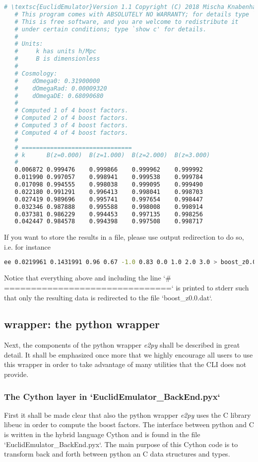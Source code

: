 \documentclass[american,11pt]{article}
\begin{document}
\begin{lstlisting}[language=bash]
   # \textsc{EuclidEmulator}Version 1.1 Copyright (C) 2018 Mischa Knabenhans & Joachim Stadel
   # This program comes with ABSOLUTELY NO WARRANTY; for details type `show w'.
   # This is free software, and you are welcome to redistribute it
   # under certain conditions; type `show c' for details.
   #
   # Units:
   # 	 k has units h/Mpc
   # 	 B is dimensionless
   #
   # Cosmology:
   #	dOmega0: 0.31900000
   #	dOmegaRad: 0.00009320
   #	dOmegaDE: 0.68090680
   #
   # Computed 1 of 4 boost factors.
   # Computed 2 of 4 boost factors.
   # Computed 3 of 4 boost factors.
   # Computed 4 of 4 boost factors.
   #
   # ===============================
   # k		B(z=0.000)	B(z=1.000)	B(z=2.000)	B(z=3.000)
   #
   0.006872	0.999476	0.999866	0.999962	0.999992
   0.011990	0.997057	0.998941	0.999538	0.999784
   0.017098	0.994555	0.998038	0.999095	0.999490
   0.022180	0.991291	0.996413	0.998041	0.998703
   0.027419	0.989696	0.995741	0.997654	0.998447
   0.032346	0.987888	0.995588	0.998008	0.998914
   0.037381	0.986229	0.994453	0.997135	0.998256
   0.042447	0.984578	0.994398	0.997508	0.998717
\end{lstlisting}
 If you want to store the results in a file, please use output redirection to do so, i.e. for instance
\begin{lstlisting}[language=bash]
   ee 0.0219961 0.1431991 0.96 0.67 -1.0 0.83 0.0 1.0 2.0 3.0 > boost_z0.0.dat
\end{lstlisting}
Notice that everything above and including the line `\# ===============================` is printed to stderr such that only the resulting data is redirected to the file `boost\_z0.0.dat`.

\subsection{wrapper: the python wrapper}
Next, the components of the python wrapper \textit{e2py} shall be described in great detail. It shall be emphasized once more that we highly encourage all users to use this wrapper in order to take advantage of many utilities that the CLI does not provide.

\subsubsection{The Cython layer in `EuclidEmulator\_BackEnd.pyx`}
First it shall be made clear that also the python wrapper \textit{e2py} uses the C library libeuc in order to compute the boost factors. The interface between python and C is written in the hybrid language Cython and is found in the file `EuclidEmulator\_BackEnd.pyx`. The main purpose of this Cython code is to transform back and forth between python an C data structures and types.
\end{document}
